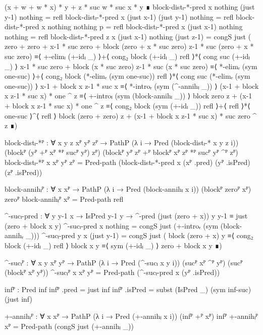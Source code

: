 \begin{code}[hide]
      (x + w + w * x) * y + z * suc w * suc x * y       ∎
  block-distₗ-*-pred x nothing (just y-1) nothing = refl
  block-distₗ-*-pred x (just x-1) (just y-1) nothing = refl
  block-distₗ-*-pred x nothing nothing p = refl
  block-distₗ-*-pred x (just x-1) nothing nothing = refl
  block-distₗ-*-pred {z} x (just x-1) nothing (just z-1) =
    congS just
      ( zero + zero + x-1 * suc zero + block (zero + x * suc zero) z-1 * suc (zero + x * suc zero) ≡⟨ +-elimₗ (+-idₗ _) ⟩+⟨ cong₂ block (+-idₗ _) refl ⟩*⟨ cong suc (+-idₗ _) ⟩
        x-1 * suc zero + block (x * suc zero) z-1 * suc (x * suc zero)                             ≡⟨ *-elimᵣ (sym one-suc) ⟩+⟨ cong₂ block (*-elimᵣ (sym one-suc)) refl ⟩*⟨ cong suc (*-elimᵣ (sym one-suc)) ⟩
        x-1 + block x z-1 * suc x                                                                  ≡⟨ *-introᵣ (sym (^-annihₗ _)) ⟩
        (x-1 + block x z-1 * suc x) * one ^ z                                                      ≡⟨ +-introₗ (sym (block-annihₗ _)) ⟩
        block zero z + (x-1 + block x z-1 * suc x) * one ^ z                                       ≡⟨ cong₂ block (sym (+-idₗ _)) refl ⟩+⟨ refl ⟩*⟨ one-suc ⟩^⟨ refl ⟩
        block (zero + zero) z + (x-1 + block x z-1 * suc x) * suc zero ^ z                         ∎)

  block-distₗ-*ᴾ :
    ∀ {x y z} xᴾ yᴾ zᴾ →
    PathP (λ i → Pred (block-distₗ-* x y z i))
      (blockᴾ (yᴾ +ᴾ xᴾ *ᴾ sucᴾ yᴾ) zᴾ)
      (blockᴾ yᴾ zᴾ +ᴾ blockᴾ xᴾ zᴾ *ᴾ sucᴾ yᴾ ^ᴾ zᴾ)
  block-distₗ-*ᴾ {x} xᴾ yᴾ zᴾ =
    Pred-path (block-distₗ-*-pred x (xᴾ .pred) (yᴾ .isPred) (zᴾ .isPred))

  block-annihₗᴾ :
    ∀ {x} xᴾ → PathP (λ i → Pred (block-annihₗ x i)) (blockᴾ zeroᴾ xᴾ) zeroᴾ
  block-annihₗᴾ xᴾ = Pred-path refl

  ^-sucₗ-pred :
    ∀ {y y-1} x → IsPred y-1 y → ^-pred (just (zero + x)) y y-1 ≡ just (zero + block x y)
  ^-sucₗ-pred x nothing = congS just (+-introᵣ (sym (block-annihᵣ _)))
  ^-sucₗ-pred {y} x (just y-1) =
    congS just
      ( block (zero + x) y ≡⟨ cong₂ block (+-idₗ _) refl ⟩
        block x y          ≡⟨ sym (+-idₗ _) ⟩
        zero + block x y   ∎)

  ^-sucₗᴾ :
    ∀ {x y} xᴾ yᴾ →
    PathP (λ i → Pred (^-sucₗ x y i)) (sucᴾ xᴾ ^ᴾ yᴾ) (sucᴾ (blockᴾ xᴾ yᴾ))
  ^-sucₗᴾ {x} xᴾ yᴾ = Pred-path (^-sucₗ-pred x (yᴾ .isPred))

  infᴾ : Pred inf
  infᴾ .pred = just inf
  infᴾ .isPred = subst (IsPred _) (sym inf-suc) (just inf)

  +-annihₗᴾ : ∀ {x} xᴾ → PathP (λ i → Pred (+-annihₗ x i)) (infᴾ +ᴾ xᴾ) infᴾ
  +-annihₗᴾ xᴾ = Pred-path (congS just (+-annihₗ _))


\end{code}
